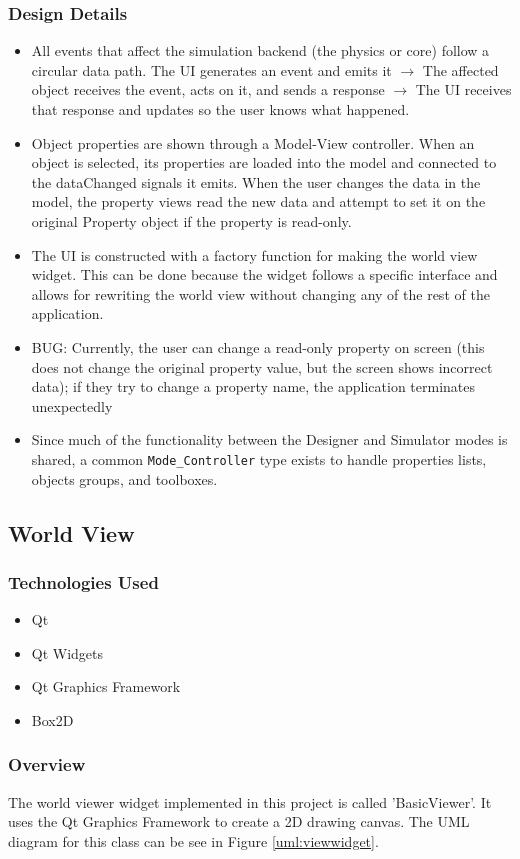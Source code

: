  \subsubsection*{Design Details}
 \begin{itemize}
 	\item All events that affect the simulation backend (the physics or core) follow a circular data path. The UI generates an event and emits it $\rightarrow$ The affected object receives the event, acts on it, and sends a response $\rightarrow$ The UI receives that response and updates so the user knows what happened.
 	\item Object properties are shown through a Model-View controller. When an object is selected, its properties are loaded into the model and connected to the dataChanged signals it emits. When the user changes the data in the model, the property views read the new data and attempt to set it on the original Property object if the property is read-only.
 	\item The UI is constructed with a factory function for making the world view widget. This can be done because the widget follows a specific interface and allows for rewriting the world view without changing any of the rest of the application.
	\item BUG: Currently, the user can change a read-only property on screen (this does not change the original property value, but the screen shows incorrect data); if they try to change a property name, the application terminates unexpectedly
	\item Since much of the functionality between the Designer and Simulator modes is shared, a common \lstinline|Mode_Controller| type exists to handle properties lists, objects groups, and toolboxes.
 \end{itemize}
\subsection{World View}
\subsubsection*{Technologies Used}
\begin{itemize}
	\item Qt
	\item Qt Widgets
	\item Qt Graphics Framework
	\item Box2D
\end{itemize}
\subsubsection*{Overview}
The world viewer widget implemented in this project is called 'BasicViewer'. It uses the Qt Graphics Framework to create a 2D drawing canvas. The UML diagram for this class can be see in Figure \ref{uml:viewwidget}.

